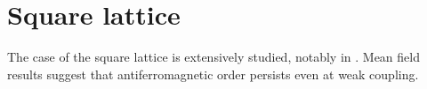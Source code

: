 \section{Square lattice}
\label{sec:square}

The case of the square lattice is extensively studied, notably in  \cite{white_numerical_1989}.
Mean field results suggest that antiferromagnetic order persists even at weak coupling.